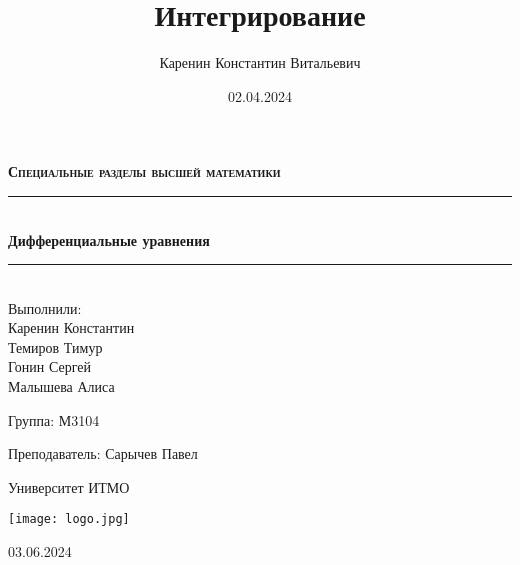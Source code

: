 \documentclass{article}
\title{Интегрирование}
\author{Каренин Константин Витальевич}
\date{02.04.2024}
\begin{document}
\begin{titlepage}
    \centering
    \vspace*{0.5 cm}
    
    \textsc{\LARGE \textbf{Специальные разделы высшей математики}}
    \vspace{1.5cm}
    
    \rule{\linewidth}{0.2 mm} \\[0.4 cm]
    { \huge \bfseries Дифференциальные уравнения}
    \rule{\linewidth}{0.2 mm} \\[1.5 cm]
    
    \Large Выполнили: \\
    Каренин Константин \\
    Темиров Тимур \\
    Гонин Сергей \\
    Малышева Алиса \\
    
    \vspace{0.5cm}
    
    Группа: М3104
    
    \vspace{0.5cm}
    
    Преподаватель: Сарычев Павел
    
    \vspace{0.5cm}
    
    Университет ИТМО
    
    \vfill

    \texttt{[image: logo.jpg]}
    
    03.06.2024
    
\end{titlepage}

\setcounter{page}{2}

\newpage
\end{document}
